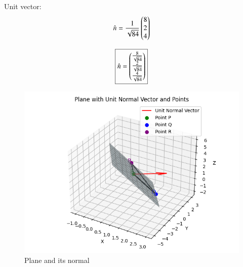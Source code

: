\documentclass[journal]{IEEEtran}
\begin{document}
Unit vector:
\[
\hat{n} = \frac{1}{\sqrt{84}} \begin{pmatrix}8 \\ 2 \\ 4\end{pmatrix}
\]

\[
\boxed{
\hat{n} = \begin{pmatrix}\frac{8}{\sqrt{84}} \\ \frac{2}{\sqrt{84}} \\ \frac{4}{\sqrt{84}}\end{pmatrix}
}
\]

\begin{figure}[H]
    \centering
    \includegraphics[width=1\linewidth]{Figs/fig1.png}
    \caption{Plane and its normal}
    \label{fig:fig1}
\end{figure}
\end{document}
